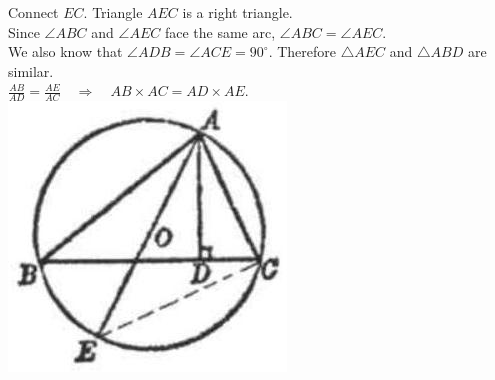 \documentclass[10pt]{article}
\begin{document}
Connect \(E C\). Triangle \(A E C\) is a right triangle.\\
Since \(\angle A B C\) and \(\angle A E C\) face the same arc, \(\angle A B C=\angle A E C\).\\
We also know that \(\angle A D B=\angle A C E=90^{\circ}\). Therefore \(\triangle A E C\) and \(\triangle A B D\) are similar.\\
\(\frac{A B}{A D}=\frac{A E}{A C} \quad \Rightarrow \quad A B \times A C=A D \times A E\).\\
\includegraphics[max width=\textwidth, center]{2025_04_17_97bc1f7e44d93c271a88g-173}
\end{document}
